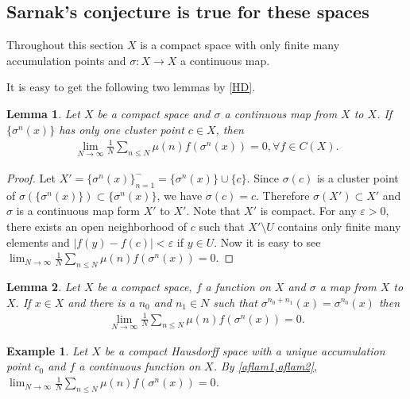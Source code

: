 \documentclass[a4paper,10pt]{amsart}
\newtheorem{example}{Example}[section]
\newtheorem{lemma}{Lemma}[section]
\begin{document}
\subsection{Sarnak's conjecture is true for these spaces}

Throughout this section $X$ is a compact space with only finite many
accumulation points and $\sigma : X \rightarrow X$ a continuous map.

It is easy to get the following two lemmas by \cref{HD}.

\begin{lemma} \label{aflam1}
    Let $X$ be a compact space and $\sigma$ a continuous map 
    from $X$ to $X$.
    If $\{\sigma^{n}(x) \}$ has only one cluster point $c \in X$, then
   \begin{align*}
       \lim_{N \rightarrow \infty}
        \frac{1}{N} \sum_{n \leq N}\mu(n)f(\sigma^{n}(x)) = 0, 
        \forall f \in C(X).
   \end{align*}
\end{lemma}

\begin{proof}
Let $X' = \{\sigma^{n}(x)\}_{n=1}^{-} = \{\sigma^{n}(x)\} \cup \{c\}$. 
Since $\sigma(c)$ is a cluster point of 
$\sigma(\{ \sigma^{n}(x) \}) \subset \{ \sigma^{n}(x) \}$, 
we have $\sigma(c) = c$. Therefore
$\sigma(X') \subset X'$ and $\sigma$ is a continuous map form $X'$ to $X'$.
Note that $X'$ is compact. For any $\varepsilon > 0$, there exists an 
open neighborhood of $c$ such that $X' \setminus U$ contains 
only finite many elements and $| f(y) - f(c)| < \varepsilon$ if
$y \in U$. Now it is easy to see $\lim_{N \rightarrow \infty}
        \frac{1}{N} \sum_{n \leq N}\mu(n)f(\sigma^{n}(x)) = 0$.
\end{proof}

\begin{lemma}\label{aflam2}
   Let $X$ be a compact space, $f$ a function on $X$ and $\sigma$ a map from
   $X$ to $X$. If $x \in X$ and there is a $n_0$ and $n_{1} \in N$ such that
   $\sigma^{n_0 + n_1}(x) = \sigma^{n_0}(x)$ then
   \begin{align*}
       \lim_{N \rightarrow \infty}
        \frac{1}{N} \sum_{n \leq N}\mu(n)f(\sigma^{n}(x)) = 0.
   \end{align*}
\end{lemma}

\begin{example}
   Let $X$ be a compact Hausdorff space with a unique accumulation 
   point $c_0$ and $f$ a continuous function on $X$. 
   By \cref{aflam1,aflam2}, 
   $\lim_{N \rightarrow \infty}
   \frac{1}{N} \sum_{n \leq N}\mu(n)f(\sigma^{n}(x)) = 0$.  
\end{example}
\end{document}
